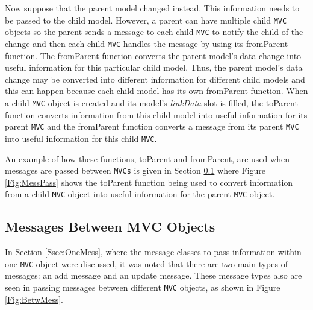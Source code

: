 \documentclass{article}[11pt]
\newcommand{\Rfunction}[1]{{\textsf{#1}}}
\newcommand{\Robject}[1]{{\texttt{#1}}}
\newcommand{\Rslot}[1]{\textsl{#1}}
\begin{document}
Now suppose that the parent model changed instead.  This information
needs to be passed to the child model.  However, a parent can have
multiple child \Robject{MVC} objects so the parent sends a message to each
child \Robject{MVC} to notify the child of the change and then each child
\Robject{MVC} handles the message by using its \Rfunction{fromParent}
function.  The \Rfunction{fromParent} function converts the parent
model's data change into useful information for this
particular child model.  Thus, the parent model's data
change may be converted into different information for different child models
and this can happen because each child model has
its own \Rfunction{fromParent} function.  When a child \Robject{MVC} object is
created and its model's \Rslot{linkData} slot is filled, the
\Rfunction{toParent} function converts information from this child
model into useful information for its parent \Robject{MVC} and the
\Rfunction{fromParent} function converts a message from its parent
\Robject{MVC} into useful information for this child \Robject{MVC}.

An example of how these functions, \Rfunction{toParent} and
\Rfunction{fromParent}, are used when messages are passed between
\Robject{MVCs} is given in Section \ref{Ssec:MultMess} where Figure
\ref{Fig:MessPass} shows the \Rfunction{toParent} function being used to
convert information from a child \Robject{MVC} object into useful information
for the parent \Robject{MVC} object.

\subsection{Messages Between MVC Objects}\label{Ssec:MultMess}

In Section \ref{Ssec:OneMess}, where the message classes to pass
information within one \Robject{MVC} object were discussed, it was noted that
there are two main types of messages: an add message and an update message.
These message types also are seen in passing messages between different
\Robject{MVC} objects, as shown in Figure \ref{Fig:BetwMess}.  
\end{document}
